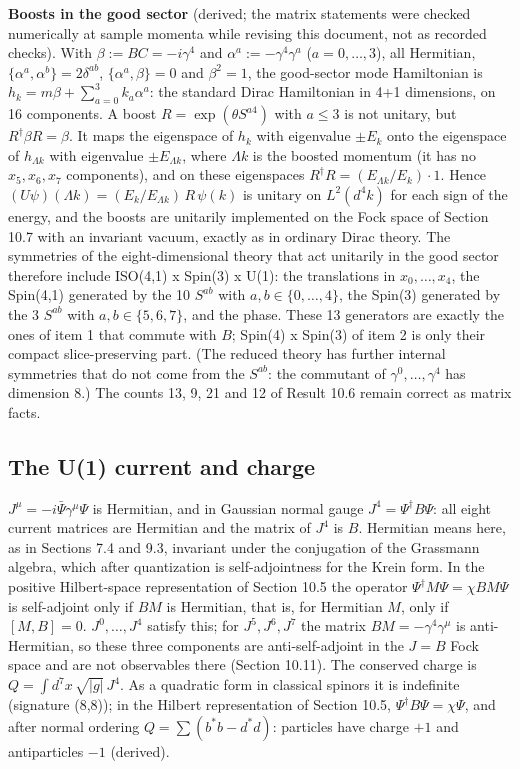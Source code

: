 \documentclass[11pt]{article}
\begin{document}
\textbf{Boosts in the good sector} (derived; the matrix statements were checked numerically at sample momenta while revising this document, not as recorded checks). With $\beta:=BC=-i\gamma^4$ and $\alpha^a:=-\gamma^4\gamma^a$ ($a=0,\dots,3$), all Hermitian, $\{\alpha^a,\alpha^b\}=2\delta^{ab}$, $\{\alpha^a,\beta\}=0$ and $\beta^2=1$, the good-sector mode Hamiltonian is $h_k=m\beta+\sum_{a=0}^{3}k_a\alpha^a$: the standard Dirac Hamiltonian in 4+1 dimensions, on 16 components. A boost $R=\exp(\theta S^{a4})$ with $a\le3$ is not unitary, but $R^\dagger\beta R=\beta$. It maps the eigenspace of $h_k$ with eigenvalue $\pm E_k$ onto the eigenspace of $h_{\Lambda k}$ with eigenvalue $\pm E_{\Lambda k}$, where $\Lambda k$ is the boosted momentum (it has no $x_5,x_6,x_7$ components), and on these eigenspaces $R^\dagger R=(E_{\Lambda k}/E_k)\cdot1$. Hence $(U\psi)(\Lambda k)=(E_k/E_{\Lambda k})\,R\,\psi(k)$ is unitary on $L^2(d^4k)$ for each sign of the energy, and the boosts are unitarily implemented on the Fock space of Section 10.7 with an invariant vacuum, exactly as in ordinary Dirac theory. The symmetries of the eight-dimensional theory that act unitarily in the good sector therefore include ISO(4,1) x Spin(3) x U(1): the translations in $x_0,\dots,x_4$, the Spin(4,1) generated by the 10 $S^{ab}$ with $a,b\in\{0,\dots,4\}$, the Spin(3) generated by the 3 $S^{ab}$ with $a,b\in\{5,6,7\}$, and the phase. These 13 generators are exactly the ones of item 1 that commute with $B$; Spin(4) x Spin(3) of item 2 is only their compact slice-preserving part. (The reduced theory has further internal symmetries that do not come from the $S^{ab}$: the commutant of $\gamma^0,\dots,\gamma^4$ has dimension 8.) The counts 13, 9, 21 and 12 of Result 10.6 remain correct as matrix facts.

\subsection{The U(1) current and charge}

$J^\mu=-i\bar\Psi\gamma^\mu\Psi$ is Hermitian, and in Gaussian normal gauge $J^4=\Psi^\dagger B\Psi$: all eight current matrices are Hermitian and the matrix of $J^4$ is $B$. Hermitian means here, as in Sections 7.4 and 9.3, invariant under the conjugation of the Grassmann algebra, which after quantization is self-adjointness for the Krein form. In the positive Hilbert-space representation of Section 10.5 the operator $\Psi^\dagger M\Psi=\chi BM\Psi$ is self-adjoint only if $BM$ is Hermitian, that is, for Hermitian $M$, only if $[M,B]=0$. $J^0,\dots,J^4$ satisfy this; for $J^5,J^6,J^7$ the matrix $BM=-\gamma^4\gamma^\mu$ is anti-Hermitian, so these three components are anti-self-adjoint in the $J=B$ Fock space and are not observables there (Section 10.11). The conserved charge is $Q=\int d^7x\,\sqrt{|g|}\,J^4$. As a quadratic form in classical spinors it is indefinite (signature (8,8)); in the Hilbert representation of Section 10.5, $\Psi^\dagger B\Psi=\chi\Psi$, and after normal ordering $Q=\sum(b^\ast b-d^\ast d)$: particles have charge $+1$ and antiparticles $-1$ (derived).
\end{document}
